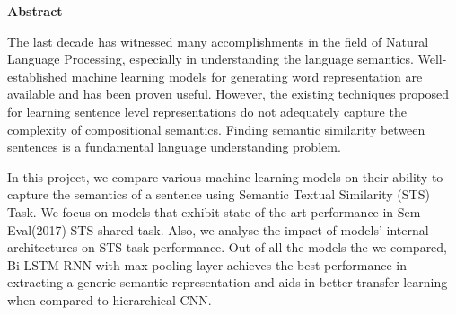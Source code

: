 \begin{center}
	\textbf{Abstract}
\end{center}


The last decade has witnessed many accomplishments in the field of Natural Language Processing, especially in understanding the language semantics. Well-established machine learning models for generating word representation are available and has been proven useful. However, the existing techniques proposed for learning sentence level representations do not adequately capture the complexity of compositional semantics. Finding semantic similarity between sentences is a fundamental language understanding problem. 

In this project, we compare various machine learning models on their ability to capture the semantics of a sentence using Semantic Textual Similarity (STS) Task. We focus on models that exhibit state-of-the-art performance in Sem-Eval(2017) STS shared task. Also, we analyse the impact of models' internal architectures on STS task performance. Out of all the models the we compared, Bi-LSTM RNN with max-pooling layer achieves the best performance in extracting a generic semantic representation and aids in better transfer learning when compared to hierarchical CNN.